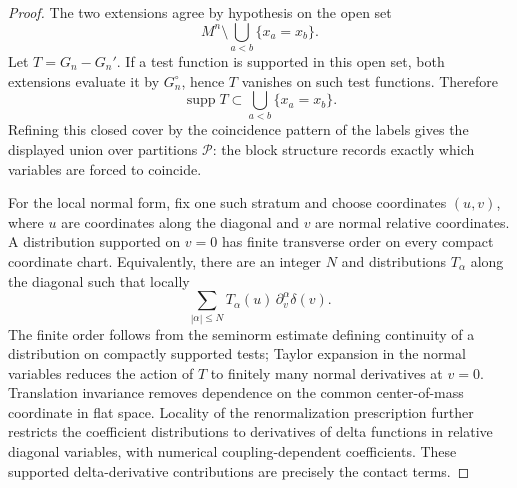 \begin{proof}
The two extensions agree by hypothesis on the open set
\[
  M^n\setminus \bigcup_{a<b}\{x_a=x_b\}.
\]
Let \(T=G_n-G_n'\).  If a test function is supported in this open set, both
extensions evaluate it by \(G_n^\circ\), hence \(T\) vanishes on such test
functions.  Therefore
\[
  \operatorname{supp}T
  \subset
  \bigcup_{a<b}\{x_a=x_b\}.
\]
Refining this closed cover by the coincidence pattern of the labels gives
the displayed union over partitions \(\mathcal P\): the block structure
records exactly which variables are forced to coincide.

For the local normal form, fix one such stratum and choose coordinates
\((u,v)\), where \(u\) are coordinates along the diagonal and \(v\) are
normal relative coordinates.  A distribution supported on \(v=0\) has finite
transverse order on every compact coordinate chart.  Equivalently, there are
an integer \(N\) and distributions \(T_\alpha\) along the diagonal such that
locally
\[
  \sum_{|\alpha|\le N} T_\alpha(u)\,\partial_v^\alpha\delta(v).
\]
The finite order follows from the seminorm estimate defining continuity of a
distribution on compactly supported tests; Taylor expansion in the normal
variables reduces the action of \(T\) to finitely many normal derivatives at
\(v=0\).  Translation invariance removes dependence on the common
center-of-mass coordinate in flat space.  Locality of the renormalization
prescription further restricts the coefficient distributions to derivatives
of delta functions in relative diagonal variables, with numerical
coupling-dependent coefficients.  These supported delta-derivative
contributions are precisely the contact terms.
\end{proof}

